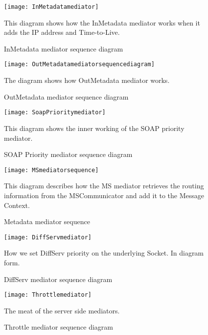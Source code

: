         \begin{figure}[H]
            \centering
            \texttt{[image: InMetadatamediator]}
            \caption{InMetadata mediator sequence diagram}
            This diagram shows how the InMetadata mediator works when it adds the IP address and Time-to-Live.
            \label{fig:InMetadatamediator}
        \end{figure}
        
        \begin{figure}[H]
            \centering
            \texttt{[image: OutMetadatamediatorsequencediagram]}
            \caption{OutMetadata mediator sequence diagram}
            The diagram shows how OutMetadata mediator works.
            \label{fig:OutMetadatamediatorsequencediagram}
        \end{figure}
        
        \begin{figure}[H] 
            \centering
            \texttt{[image: SoapPrioritymediator]}
            \caption{SOAP Priority mediator sequence diagram}
            This diagram shows the inner working of the SOAP priority mediator.
            \label{fig:SoapPrioritymediator}
        \end{figure}
    
        \begin{figure}[H] 
            \centering
            \texttt{[image: MSmediatorsequence]}
            \caption{Metadata mediator sequence}
            This diagram describes how the MS mediator retrieves the routing information from the MSCommunicator and add it to the Message Context.
            \label{fig:MSmediatorsequence}
        \end{figure}
        
        \begin{figure}[H]
            \centering
            \texttt{[image: DiffServmediator]}
            \caption{DiffServ mediator sequence diagram}
            How we set DiffServ priority on the underlying Socket. In diagram form.
            \label{fig:DiffServmediator}
        \end{figure}
        
        \begin{figure}[H] 
            \centering
            \texttt{[image: Throttlemediator]}
            \caption{Throttle mediator sequence diagram}
            The meat of the server side mediators.
            \label{fig:Throttlemediator}
        \end{figure}
        


